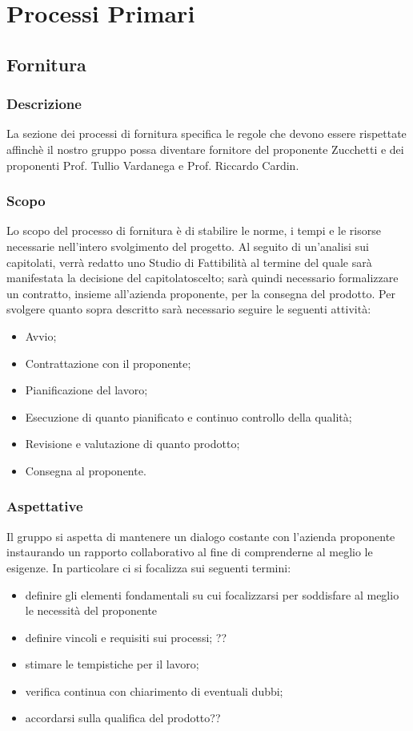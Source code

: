 \section{Processi Primari}

\subsection{Fornitura}
\subsubsection{Descrizione}
La sezione dei processi di fornitura specifica le regole che devono essere rispettate affinchè il nostro gruppo possa diventare fornitore del proponente Zucchetti e dei proponenti Prof. Tullio Vardanega e Prof. Riccardo Cardin.
\subsubsection{Scopo}
Lo scopo del processo di fornitura è di stabilire le norme, i tempi e le risorse necessarie nell'intero svolgimento del progetto.
Al seguito di un'analisi sui capitolati, verrà redatto uno Studio di Fattibilità al termine del quale sarà manifestata la decisione del capitolato\glosp scelto; sarà quindi necessario formalizzare un contratto, insieme all'azienda proponente, per la consegna del prodotto. 
Per svolgere quanto sopra descritto sarà necessario seguire le seguenti attività:
\begin{itemize}
	\item Avvio;
	\item Contrattazione con il proponente;
	\item Pianificazione del lavoro;
	\item Esecuzione di quanto pianificato e continuo controllo della qualità;
	\item Revisione e valutazione di quanto prodotto;
	\item Consegna al proponente.
\end{itemize}
\subsubsection{Aspettative}
Il gruppo si aspetta di mantenere un dialogo costante con l'azienda proponente instaurando un rapporto collaborativo al fine di comprenderne al meglio le esigenze. In particolare ci si focalizza sui seguenti termini:
\begin{itemize}
	\item definire gli elementi fondamentali su cui focalizzarsi per soddisfare al meglio le necessità del proponente
	\item definire vincoli e requisiti sui processi; ??
	\item stimare le tempistiche per il lavoro;
	\item verifica continua con chiarimento di eventuali dubbi;
	\item accordarsi sulla qualifica del prodotto??
\end{itemize}

